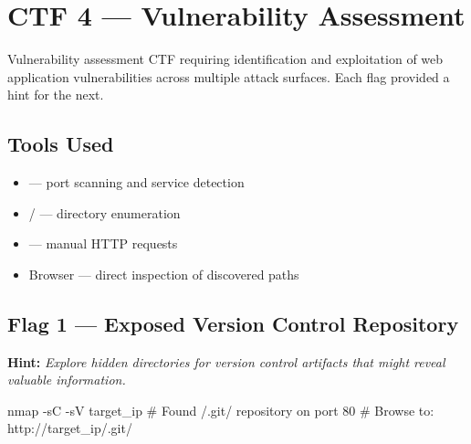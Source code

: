 \chapter{CTF 4 --- Vulnerability Assessment}
\label{ctf:ctf4}

\begin{notebox}
Vulnerability assessment CTF requiring identification and exploitation of web
application vulnerabilities across multiple attack surfaces. Each flag provided
a hint for the next.
\end{notebox}

\section*{Tools Used}
\begin{itemize}
  \item {} --- port scanning and service detection
  \item {} /  --- directory enumeration
  \item {} --- manual HTTP requests
  \item Browser --- direct inspection of discovered paths
\end{itemize}

\section*{Flag 1 --- Exposed Version Control Repository}

\textbf{Hint:} \textit{Explore hidden directories for version control artifacts
that might reveal valuable information.}



\begin{termbox}
nmap -sC -sV target_ip
# Found /.git/ repository on port 80
# Browse to: http://target_ip/.git/
\end{termbox}

